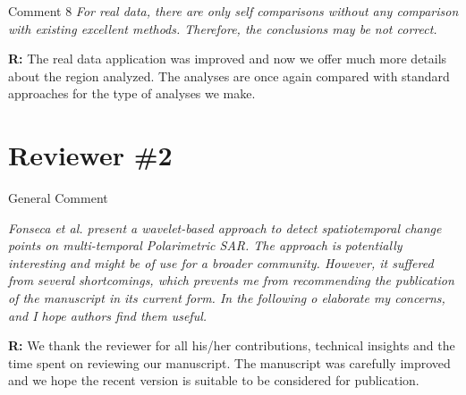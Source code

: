 \documentclass[11pt]{report}
\begin{document}
\vspace{0.3cm}

\medskip
\begin{mybox}{Comment 8}
\textit{For real data, there are only self comparisons without any comparison with existing excellent methods. Therefore, the
conclusions may be not correct.}


\medskip
\textbf{R:} The real data application was improved and now we offer much more details about the region analyzed. The analyses are once again compared with standard approaches for the type of analyses we make.

\medskip

\end{mybox}



\newpage



\vspace{0.25cm}

\section*{Reviewer \#2}


\begin{mybox}{General Comment}

\textit{Fonseca et al. present a wavelet-based approach to detect spatiotemporal change points on multi-temporal Polarimetric
SAR. The approach is potentially interesting and might be of use for a broader community. However, it suffered from
several shortcomings, which prevents me from recommending the publication of the manuscript in its current form. In the
following o elaborate my concerns, and I hope authors find them useful.}

\medskip

\textbf{R:} We thank the reviewer for all his/her contributions, technical insights and the time
spent on reviewing our manuscript. The manuscript was carefully improved and we hope the recent version is suitable to be considered for publication.
\end{mybox}
\end{document}
